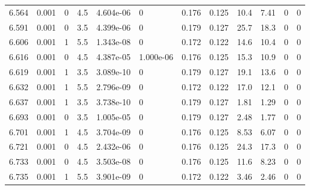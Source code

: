 \documentclass[preview]{standalone}
\begin{document}
{{{{{{\begin{tabular}{L{1.2cm}C{1.2cm} C{0.3cm}C{0.5cm} C{1.4cm}C{1.4cm} C{1.4cm}C{1.4cm} C{1.6cm}C{1.6cm} C{1.6cm}C{1.6cm}}
  6.564  &  0.001  & 0     & 4.5 &  4.604e-06  & 0  &  0.176&   0.125& 10.4 & 7.41   &  0 & 0  \\ 
  6.591  &  0.001  & 0     & 3.5 &  4.399e-06  & 0  &  0.179&   0.127& 25.7 & 18.3   &  0 & 0  \\ 
  6.606  &  0.001  & 1     & 5.5 &  1.343e-08  & 0  &  0.172&   0.122& 14.6 & 10.4   &  0 & 0  \\ 
  6.616  &  0.001  & 0     & 4.5 &  4.387e-05  & 1.000e-06  &  0.176&   0.125& 15.3 & 10.9   &  0 & 0  \\ 
  6.619  &  0.001  & 1     & 3.5 &  3.089e-10  & 0  &  0.179&   0.127& 19.1 & 13.6   &  0 & 0  \\ 
  6.632  &  0.001  & 1     & 5.5 &  2.796e-09  & 0  &  0.172&   0.122& 17.0 & 12.1   &  0 & 0  \\ 
  6.637  &  0.001  & 1     & 3.5 &  3.738e-10  & 0  &  0.179&   0.127& 1.81 & 1.29   &  0 & 0  \\ 
  6.693  &  0.001  & 0     & 3.5 &  1.005e-05  & 0  &  0.179&   0.127& 2.48 & 1.77   &  0 & 0  \\ 
  6.701  &  0.001  & 1     & 4.5 &  3.704e-09  & 0  &  0.176&   0.125& 8.53 & 6.07   &  0 & 0  \\ 
  6.721  &  0.001  & 0     & 4.5 &  2.432e-06  & 0  &  0.176&   0.125& 24.3 & 17.3   &  0 & 0  \\ 
  6.733  &  0.001  & 0     & 4.5 &  3.503e-08  & 0  &  0.176&   0.125& 11.6 & 8.23   &  0 & 0  \\ 
  6.735  &  0.001  & 1     & 5.5 &  3.901e-09  & 0  &  0.172&   0.122& 3.46 & 2.46   &  0 & 0  \\ 
\hline 
\end{tabular} 

}}}}}}
\end{document}
